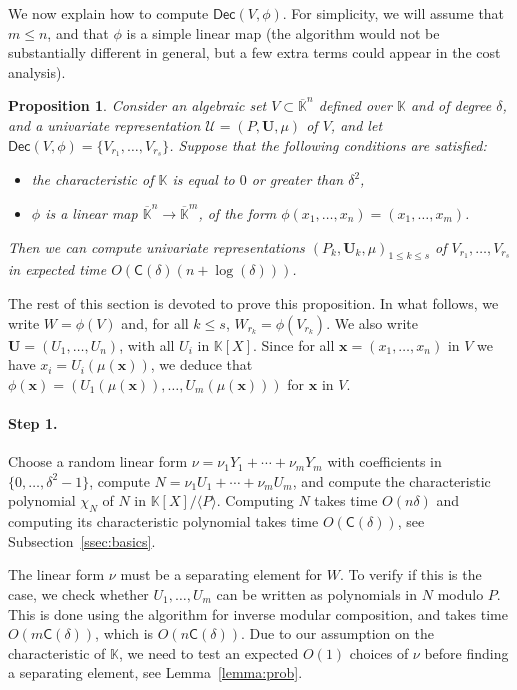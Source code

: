 \documentclass[12pt]{article}
\def\CC {\ensuremath{\mathsf{C}}}
\def\K {\ensuremath{\mathbb{K}}}
\def\Kbar {\ensuremath{\overline{\mathbb{K}}}}
\def\Uu {\ensuremath{\mathbf{U}}}
\def\x {\ensuremath{\mathbf{x}}}
\def\Ur {\ensuremath{\mathscr U}}
\def\Dec {\ensuremath{\mathsf{Dec}}}
\newtheorem{Prop}{Proposition}
\begin{document}
We now explain how to compute $\Dec(V,\phi)$.  For simplicity, we will
assume that $m \le n$, and that $\phi$ is a simple linear map (the
algorithm would not be substantially different in general, but a few
extra terms could appear in the cost analysis).
\begin{Prop}\label{prop:dec}
  Consider an algebraic set $V\subset \Kbar^n$ defined over $\K$ and
  of degree $\delta$, and a univariate representation
  $\Ur=(P,\Uu,\mu)$ of $V$, and let
  $\Dec(V,\phi)=\{V_{r_1},\dots,V_{r_s}\}$. Suppose that the following
  conditions are satisfied:
  \begin{itemize}
  \item the characteristic of $\K$ is equal to $0$ or greater than
    $\delta^2$,
  \item $\phi$ is a linear map $\Kbar^n \to \Kbar^m$, of the form
    $\phi(x_1,\dots,x_n)=(x_1,\dots,x_m)$.
  \end{itemize}
  Then we can compute univariate representations $(P_k,\Uu_k,\mu)_{1
    \le k \le s}$ of $V_{r_1},\dots,V_{r_s}$ in expected time
  $O(\CC(\delta)(n+\log(\delta)) )$.
\end{Prop}
The rest of this section is devoted to prove this proposition. In what
follows, we write $W=\phi(V)$ and, for all $k \le s$,
$W_{r_k}=\phi(V_{r_k})$. We also write $\Uu=(U_1,\dots,U_n)$, with all
$U_i$ in $\K[X]$. Since for all $\x=(x_1,\dots,x_n)$ in $V$ we have
$x_i=U_i(\mu(\x))$, we deduce that
$\phi(\x)=(U_1(\mu(\x)),\dots,U_m(\mu(\x)))$ for $\x$ in $V$.

\paragraph{Step 1.}
Choose a random linear form $\nu= \nu_1 Y_1 + \cdots + \nu_m Y_m$ with
coefficients in $\{0,\dots,\delta^2-1\}$, compute $N=\nu_1 U_1 +
\cdots + \nu_m U_m$, and compute the characteristic polynomial
$\chi_{N}$ of $N$ in $\K[X]/\langle P\rangle$. Computing $N$ takes
time $O(n\delta)$ and computing its characteristic polynomial takes
time $O(\CC(\delta))$, see Subsection~\ref{ssec:basics}.

The linear form $\nu$ must be a separating element for $W$. To verify
if this is the case, we check whether $U_1,\dots,U_m$ can be written
as polynomials in $N$ modulo $P$. This is done using the algorithm for
inverse modular composition, and takes time $O(m \CC(\delta))$, which
is $O(n \CC(\delta))$. Due to our assumption on the characteristic of
$\K$, we need to test an expected $O(1)$ choices of $\nu$ before
finding a separating element, see Lemma~\ref{lemma:prob}.
\end{document}

